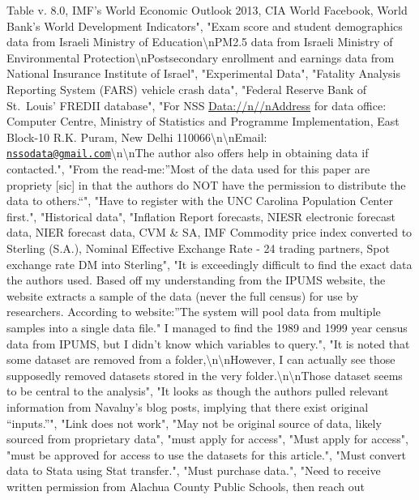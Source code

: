 \documentclass[]{article}
\begin{document}
\begin{itemize}
  Table v. 8.0, IMF's World Economic Outlook 2013, CIA World Facebook,
  World Bank's World Development Indicators", "Exam score and student
  demographics data from Israeli Ministry of
  Education\textbackslash{}nPM2.5 data from Israeli Ministry of
  Environmental Protection\textbackslash{}nPostsecondary enrollment and
  earnings data from National Insurance Institute of Israel",
  "Experimental Data", "Fatality Analysis Reporting System (FARS)
  vehicle crash data", "Federal Reserve Bank of St.~Louis' FREDII
  database", "For NSS \url{Data://n//nAddress} for data office: Computer
  Centre, Ministry of Statistics and Programme Implementation, East
  Block-10 R.K. Puram, New Delhi
  110066\textbackslash{}n\textbackslash{}nEmail:
  \href{mailto:nssodata@gmail.com}{\nolinkurl{nssodata@gmail.com}}\textbackslash{}n\textbackslash{}nThe
  author also offers help in obtaining data if contacted.", "From the
  read-me:''Most of the data used for this paper are propriety {[}sic{]}
  in that the authors do NOT have the permission to distribute the data
  to others.``", "Have to register with the UNC Carolina Population
  Center first.", "Historical data", "Inflation Report forecasts, NIESR
  electronic forecast data, NIER forecast data, CVM \& SA, IMF Commodity
  price index converted to Sterling (S.A.), Nominal Effective Exchange
  Rate - 24 trading partners, Spot exchange rate DM into Sterling", "It
  is exceedingly difficult to find the exact data the authors used.
  Based off my understanding from the IPUMS website, the website
  extracts a sample of the data (never the full census) for use by
  researchers. According to website:''The system will pool data from
  multiple samples into a single data file." I managed to find the 1989
  and 1999 year census data from IPUMS, but I didn't know which
  variables to query.", "It is noted that some dataset are removed from
  a folder,\textbackslash{}n\textbackslash{}nHowever, I can actually see
  those supposedly removed datasets stored in the very
  folder.\textbackslash{}n\textbackslash{}nThose dataset seems to be
  central to the analysis", "It looks as though the authors pulled
  relevant information from Navalny's blog posts, implying that there
  exist original ``inputs.''", "Link does not work", "May not be
  original source of data, likely sourced from proprietary data", "must
  apply for access", "Must apply for access", "must be approved for
  access to use the datasets for this article.", "Must convert data to
  Stata using Stat transfer.", "Must purchase data.", "Need to receive
  written permission from Alachua County Public Schools, then reach out

\end{itemize}
\end{document}
